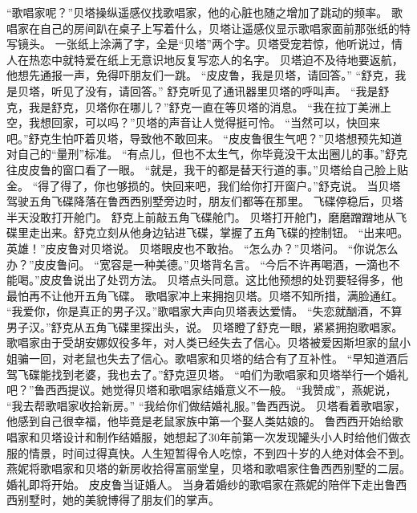 \documentclass[a4paper,12pt,UTF8,twoside]{ctexbook}
\begin{document}
        “歌唱家呢？”贝塔操纵遥感仪找歌唱家，他的心脏也随之增加了跳动的频率。  
        歌唱家在自己的房间趴在桌子上写着什么，贝塔让遥感仪显示歌唱家面前那张纸的特写镜头。  
        一张纸上涂满了字，全是“贝塔”两个字。贝塔受宠若惊，他听说过，情人在热恋中就特爱在纸上无意识地反复写恋人的名字。  
        贝塔迫不及待地要返航，他想先通报一声，免得吓朋友们一跳。  
        “皮皮鲁，我是贝塔，请回答。”  
        “舒克，我是贝塔，听见了没有，请回答。”  
        舒克听见了通讯器里贝塔的呼叫声。  
        “我是舒克，我是舒克，贝塔你在哪儿？”舒克一直在等贝塔的消息。  
        “我在拉丁美洲上空，我想回家，可以吗？”贝塔的声音让人觉得挺可怜。  
        “当然可以，快回来吧。”舒克生怕吓着贝塔，导致他不敢回来。  
        “皮皮鲁很生气吧？”贝塔想预先知道对自己的“量刑”标准。  
        “有点儿，但也不太生气，你毕竟没干太出圈儿的事。”舒克往皮皮鲁的窗口看了一眼。  
        “就是，我干的都是替天行道的事。”贝塔给自己脸上贴金。  
        “得了得了，你也够损的。快回来吧，我们给你打开窗户。”舒克说。  
        当贝塔驾驶五角飞碟降落在鲁西西别墅旁边时，朋友们都等在那里。  
        飞碟停稳后，贝塔半天没敢打开舱门。  
        舒克上前敲五角飞碟舱门。  
        贝塔打开舱门，磨磨蹭蹭地从飞碟里走出来。舒克立刻从他身边钻进飞碟，掌握了五角飞碟的控制钮。  
        “出来吧。英雄！”皮皮鲁对贝塔说。  
        贝塔眼皮也不敢抬。  
        “怎么办？”贝塔问。  
        “你说怎么办？”皮皮鲁问。  
        “宽容是一种美德。”贝塔背名言。  
        “今后不许再喝酒，一滴也不能喝。”皮皮鲁说出了处罚方法。  
        贝塔点头同意。这比他预想的处罚要轻得多，他最怕再不让他开五角飞碟。  
        歌唱家冲上来拥抱贝塔。贝塔不知所措，满脸通红。  
        “我爱你，你是真正的男子汉。”歌唱家大声向贝塔表达爱情。  
        “失恋就酗酒，不算男子汉。”舒克从五角飞碟里探出头，说。  
        贝塔瞪了舒克一眼，紧紧拥抱歌唱家。  
        歌唱家由于受胡安娜奴役多年，对人类已经失去了信心。贝塔被爱因斯坦家的鼠小姐骗一回，对老鼠也失去了信心。歌唱家和贝塔的结合有了互补性。  
        “早知道酒后驾飞碟能找到老婆，我也去了。”舒克逗贝塔。  
        “咱们为歌唱家和贝塔举行一个婚礼吧？”鲁西西提议。她觉得贝塔和歌唱家结婚意义不一般。  
        “我赞成”，燕妮说，  “我去帮歌唱家收拾新房。”  
        “我给你们做结婚礼服。”鲁西西说。  
        贝塔看着歌唱家，他感到自己很幸福，他毕竟是老鼠家族中第一个娶人类姑娘的。  
        鲁西西开始给歌唱家和贝塔设计和制作结婚服，她想起了30年前第一次发现罐头小人时给他们做衣服的情景，时间过得真快。人生短暂得令人吃惊，不到四十岁的人绝对体会不到。  
        燕妮将歌唱家和贝塔的新房收拾得富丽堂皇，贝塔和歌唱家住鲁西西别墅的二层。  
        婚礼即将开始。  
        皮皮鲁当证婚人。  
        当身着婚纱的歌唱家在燕妮的陪伴下走出鲁西西别墅时，她的美貌博得了朋友们的掌声。  
\end{document}
